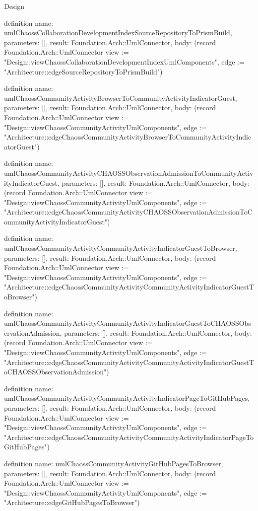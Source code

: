 \begin{lexlean}{Design}
\begin{semanticmodule}
definition{
  name: umlChaossCollaborationDevelopmentIndexSourceRepositoryToPrismBuild,
  parameters: [],
  result: Foundation.Arch::UmlConnector,
  body: (record Foundation.Arch::UmlConnector {view := "Design::viewChaossCollaborationDevelopmentIndexUmlComponents", edge := "Architecture::edgeSourceRepositoryToPrismBuild"})
}

definition{
  name: umlChaossCommunityActivityBrowserToCommunityActivityIndicatorGuest,
  parameters: [],
  result: Foundation.Arch::UmlConnector,
  body: (record Foundation.Arch::UmlConnector {view := "Design::viewChaossCommunityActivityUmlComponents", edge := "Architecture::edgeChaossCommunityActivityBrowserToCommunityActivityIndicatorGuest"})
}

definition{
  name: umlChaossCommunityActivityCHAOSSObservationAdmissionToCommunityActivityIndicatorGuest,
  parameters: [],
  result: Foundation.Arch::UmlConnector,
  body: (record Foundation.Arch::UmlConnector {view := "Design::viewChaossCommunityActivityUmlComponents", edge := "Architecture::edgeChaossCommunityActivityCHAOSSObservationAdmissionToCommunityActivityIndicatorGuest"})
}

definition{
  name: umlChaossCommunityActivityCommunityActivityIndicatorGuestToBrowser,
  parameters: [],
  result: Foundation.Arch::UmlConnector,
  body: (record Foundation.Arch::UmlConnector {view := "Design::viewChaossCommunityActivityUmlComponents", edge := "Architecture::edgeChaossCommunityActivityCommunityActivityIndicatorGuestToBrowser"})
}

definition{
  name: umlChaossCommunityActivityCommunityActivityIndicatorGuestToCHAOSSObservationAdmission,
  parameters: [],
  result: Foundation.Arch::UmlConnector,
  body: (record Foundation.Arch::UmlConnector {view := "Design::viewChaossCommunityActivityUmlComponents", edge := "Architecture::edgeChaossCommunityActivityCommunityActivityIndicatorGuestToCHAOSSObservationAdmission"})
}

definition{
  name: umlChaossCommunityActivityCommunityActivityIndicatorPageToGitHubPages,
  parameters: [],
  result: Foundation.Arch::UmlConnector,
  body: (record Foundation.Arch::UmlConnector {view := "Design::viewChaossCommunityActivityUmlComponents", edge := "Architecture::edgeChaossCommunityActivityCommunityActivityIndicatorPageToGitHubPages"})
}

definition{
  name: umlChaossCommunityActivityGitHubPagesToBrowser,
  parameters: [],
  result: Foundation.Arch::UmlConnector,
  body: (record Foundation.Arch::UmlConnector {view := "Design::viewChaossCommunityActivityUmlComponents", edge := "Architecture::edgeGitHubPagesToBrowser"})
}


\end{semanticmodule}
\end{lexlean}
